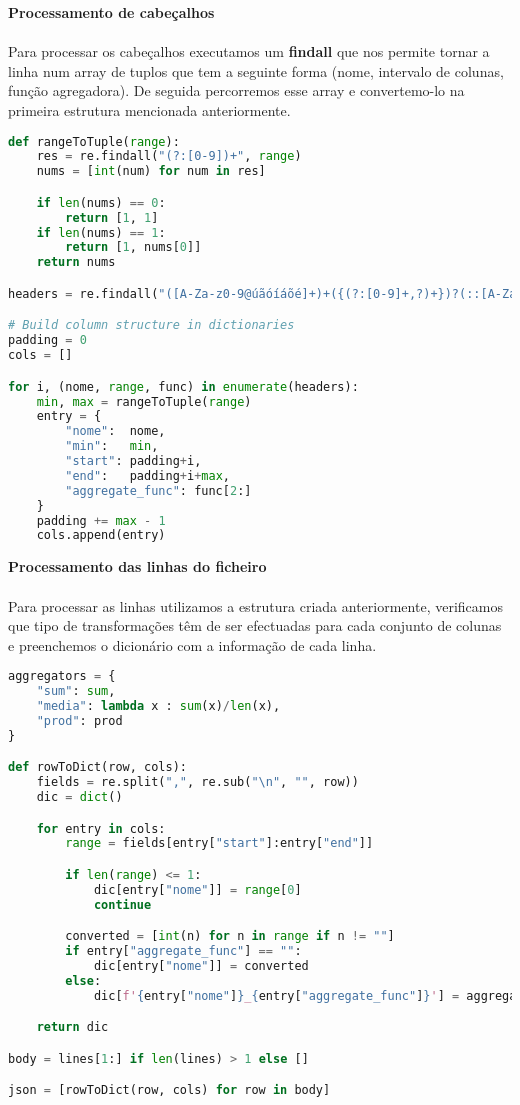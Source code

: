 \documentclass[11pt,a4paper]{report}
\begin{document}
\item\textbf{Processamento de cabeçalhos}
\paragraph{}
Para processar os cabeçalhos executamos um \textbf{findall} que nos permite tornar a linha num array de tuplos  
que tem a seguinte forma (nome, intervalo de colunas, função agregadora). De seguida percorremos esse  
array e convertemo-lo na primeira estrutura mencionada anteriormente.

\begin{lstlisting}[language=Python]
def rangeToTuple(range):
    res = re.findall("(?:[0-9])+", range)
    nums = [int(num) for num in res]

    if len(nums) == 0:
        return [1, 1]
    if len(nums) == 1:
        return [1, nums[0]]
    return nums

headers = re.findall("([A-Za-z0-9@úãóíáõé]+)+({(?:[0-9]+,?)+})?(::[A-Za-z]+)?", lines[0])

# Build column structure in dictionaries
padding = 0
cols = []

for i, (nome, range, func) in enumerate(headers):
    min, max = rangeToTuple(range)
    entry = {
        "nome":  nome,
        "min":   min,
        "start": padding+i,
        "end":   padding+i+max,
        "aggregate_func": func[2:]
    }
    padding += max - 1
    cols.append(entry)
\end{lstlisting}

\item \textbf{Processamento das linhas do ficheiro}
\paragraph{}
Para processar as linhas utilizamos a estrutura criada anteriormente, verificamos que tipo de transformações  
têm de ser efectuadas para cada conjunto de colunas e preenchemos o dicionário com a informação de cada linha.  \\
\begin{lstlisting}[language=Python]
aggregators = {
    "sum": sum,
    "media": lambda x : sum(x)/len(x),
    "prod": prod
}

def rowToDict(row, cols):
    fields = re.split(",", re.sub("\n", "", row))
    dic = dict()

    for entry in cols:
        range = fields[entry["start"]:entry["end"]]

        if len(range) <= 1:
            dic[entry["nome"]] = range[0]
            continue

        converted = [int(n) for n in range if n != ""]
        if entry["aggregate_func"] == "":
            dic[entry["nome"]] = converted
        else:
            dic[f'{entry["nome"]}_{entry["aggregate_func"]}'] = aggregators[entry["aggregate_func"]](converted)

    return dic

body = lines[1:] if len(lines) > 1 else []

json = [rowToDict(row, cols) for row in body]
\end{lstlisting}
\end{document}
